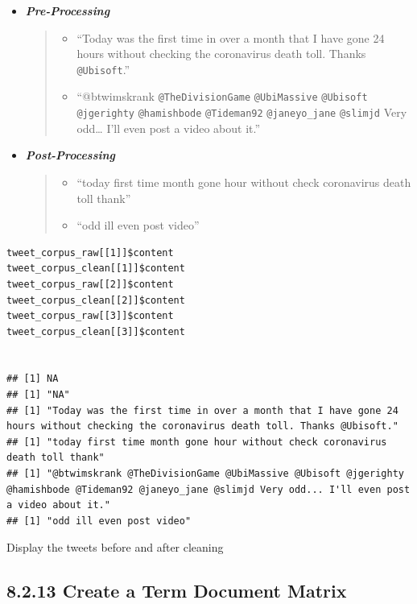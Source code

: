 \documentclass[11pt]{article}
\begin{document}
\begin{itemize}
\item \textbf{\emph{Pre-Processing}}
\begin{quote}
\begin{itemize}
\item ``Today was the first time in over a month that I have gone 24 hours without
checking the coronavirus death toll. Thanks \texttt{@Ubisoft}.''

\item ``@btwimskrank \texttt{@TheDivisionGame} \texttt{@UbiMassive} \texttt{@Ubisoft} \texttt{@jgerighty} \texttt{@hamishbode}
\texttt{@Tideman92} \texttt{@janeyo\_jane} \texttt{@slimjd} Very odd\ldots{} I'll even post a video about it.''
\end{itemize}
\end{quote}
\item \textbf{\emph{Post-Processing}}
\begin{quote}
\begin{itemize}
\item ``today first time month gone hour without check coronavirus death toll thank''

\item ``odd ill even post video''
\end{itemize}
\end{quote}
\end{itemize}

\begin{listing}[htbp]
\begin{verbatim}
tweet_corpus_raw[[1]]$content
tweet_corpus_clean[[1]]$content
tweet_corpus_raw[[2]]$content
tweet_corpus_clean[[2]]$content
tweet_corpus_raw[[3]]$content
tweet_corpus_clean[[3]]$content


## [1] NA
## [1] "NA"
## [1] "Today was the first time in over a month that I have gone 24 hours without checking the coronavirus death toll. Thanks @Ubisoft."
## [1] "today first time month gone hour without check coronavirus death toll thank"
## [1] "@btwimskrank @TheDivisionGame @UbiMassive @Ubisoft @jgerighty @hamishbode @Tideman92 @janeyo_jane @slimjd Very odd... I'll even post a video about it."
## [1] "odd ill even post video"
\end{verbatim}
\caption{\label{org0bb1b0b}Display the tweets before and after cleaning}
\end{listing}


\subsection{8.2.13 Create a Term Document Matrix}
\label{sec:orge695929}
\end{document}
